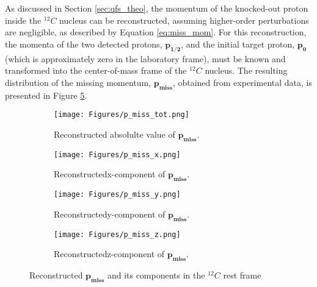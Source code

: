 As discussed in Section \ref{sec:qfs_theo}, the momentum of the knocked-out proton inside the $^{12}C$ nucleus can be reconstructed, assuming higher-order perturbations are negligible, as described by Equation \ref{eq:miss_mom}. For this reconstruction, the momenta of the two detected protons, $\mathbf{p_{1/2}}$, and the initial target proton, $\mathbf{p_{0}}$ (which is approximately zero in the laboratory frame), must be known and transformed into the center-of-mass frame of the $^{12}C$ nucleus. The resulting distribution of the missing momentum, $\mathbf{p_{miss}}$, obtained from experimental data, is presented in Figure \ref{fig:p_miss}.\newline
\begin{figure}[htpb]
    \centering
    \begin{subfigure}[b]{0.9\textwidth}
        \centering
        \texttt{[image: Figures/p\_miss\_tot.png]} %
        \caption{Reconstructed absolulte value of $\mathbf{p_{miss}}$.}
        \label{fig:p_miss_tot}
    \end{subfigure}

    \begin{subfigure}[b]{0.3\textwidth}
        \centering
        \texttt{[image: Figures/p\_miss\_x.png]} %
        \caption{Reconstructed\newline x-component of $\mathbf{p_{miss}}$.}
        \label{fig:p_miss_x}
    \end{subfigure}
    \begin{subfigure}[b]{0.3\textwidth}
        \centering
        \texttt{[image: Figures/p\_miss\_y.png]} %
        \caption{Reconstructed\newline y-component of $\mathbf{p_{miss}}$.}
        \label{fig:p_miss_y}
    \end{subfigure}
    \begin{subfigure}[b]{0.3\textwidth}
        \centering
        \texttt{[image: Figures/p\_miss\_z.png]} %
        \caption{Reconstructed\newline z-component of $\mathbf{p_{miss}}$.}
        \label{fig:p_miss_z}
    \end{subfigure}

    \caption{Reconstructed $\mathbf{p_{miss}}$ and its components in the $^{12}C$ rest frame}
    \label{fig:p_miss}
\end{figure}

